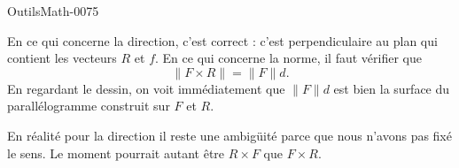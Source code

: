 
\begin{corrige}{OutilsMath-0075}

    En ce qui concerne la direction, c'est correct : c'est perpendiculaire au plan qui contient les vecteurs $R$ et $f$. En ce qui concerne la norme, il faut vérifier que
    \begin{equation}
        \| F\times R \|=\| F \|d.
    \end{equation}
    En regardant le dessin, on voit immédiatement que $\| F \|d$ est bien la surface du parallélogramme construit sur $F$ et $R$.

    \begin{remark}
        En réalité pour la direction il reste une ambigüité parce que nous n'avons pas fixé le sens. Le moment pourrait autant être $R\times F$ que $F\times R$.
    \end{remark}

\end{corrige}
